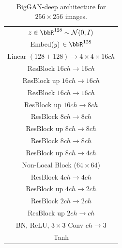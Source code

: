 \begin{table}[ht]
         \caption{\label{tab:deep_resnets_imagenet256} BigGAN-deep architecture for $256\times 256$ images.}
          \centering
          \small
          \begin{subtable}{.4\textwidth}
              \centering
              {\begin{tabular}{c}
                  \toprule
                  \midrule
                  $z\in \bbR^{128} \sim \mathcal{N}(0, I)$ \\
                  Embed($y$) $\in \bbR^{128}$ \\
                  \midrule
                  Linear $(128+128) \rightarrow 4 \times 4 \times 16 ch $ \\
                  \midrule
                  ResBlock $16ch \rightarrow 16ch$ \\
                  \midrule
                  ResBlock up $16ch \rightarrow 16ch$ \\
                  \midrule
                  ResBlock $16ch \rightarrow 16ch$ \\
                  \midrule
                  ResBlock up $16ch \rightarrow 8ch$ \\
                  \midrule
                  ResBlock $8ch \rightarrow 8ch$ \\
                  \midrule
                  ResBlock up $8ch \rightarrow 8ch$ \\
                  \midrule
                  ResBlock $8ch \rightarrow 8ch$ \\
                  \midrule
                  ResBlock up $8ch \rightarrow 4ch$ \\
                  \midrule
                  Non-Local Block ($64\times 64$)\\
                  \midrule
                  ResBlock $4ch \rightarrow 4ch$ \\
                  \midrule
                  ResBlock up $4ch \rightarrow 2ch$ \\
                  \midrule
                  ResBlock $2ch \rightarrow 2ch$ \\
                  \midrule
                  ResBlock up $2ch \rightarrow ch$ \\
                  \midrule
                  BN, ReLU, $3\times 3$ Conv $ch\rightarrow 3$ \\
                  \midrule
                  Tanh\\
                  \midrule
                  \bottomrule

\end{tabular}}
\end{subtable}
\end{table}
